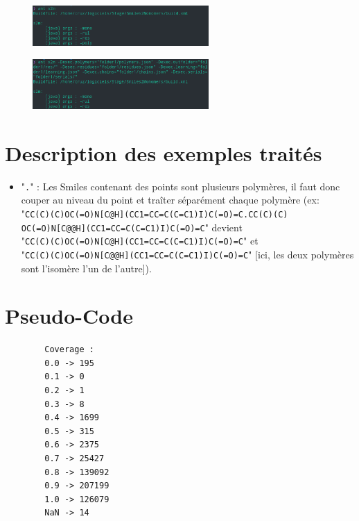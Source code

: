 \documentclass[11pt, a4paper]{report}
\begin{document}
	\begin{figure}[H]
		\captionsetup{justification=centering}
		\centering
		\includegraphics[width=0.6\textwidth]{images/ants2m.png}
	\end{figure}
	\vspace{0.000000000001cm}
	\begin{figure}[H]
		\captionsetup{justification=centering}
		\centering
		\includegraphics[width=0.6\textwidth]{images/ants2m-D.png}
	\end{figure}
	
	
	\chapter{Description des exemples traités}
	\begin{itemize}
		\item "\verb|.|" : Les Smiles contenant des points sont plusieurs polymères, il faut donc couper au niveau du point et traîter séparément chaque polymère (ex:
		\\"\verb|CC(C)(C)OC(=O)N[C@H](CC1=CC=C(C=C1)I)C(=O)=C.CC(C)(C)|\\\verb|OC(=O)N[C@@H](CC1=CC=C(C=C1)I)C(=O)=C|" devient \\"\verb|CC(C)(C)OC(=O)N[C@H](CC1=CC=C(C=C1)I)C(=O)=C|" et\\  "\verb|CC(C)(C)OC(=O)N[C@@H](CC1=CC=C(C=C1)I)C(=O)=C|" [ici, les deux polymères sont l'isomère l'un de l'autre]).
	\end{itemize}

	\chapter{Pseudo-Code}
	\begin{lstlisting}
		Coverage :
		0.0 -> 195
		0.1 -> 0
		0.2 -> 1
		0.3 -> 8
		0.4 -> 1699
		0.5 -> 315
		0.6 -> 2375
		0.7 -> 25427
		0.8 -> 139092
		0.9 -> 207199
		1.0 -> 126079
		NaN -> 14
	\end{lstlisting}
	
\end{document}
